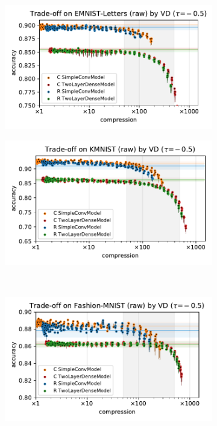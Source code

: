 \documentclass[a4paper,10pt,twocolumn]{article}
\begin{document}
\begin{figure}[b]
  \centering
  \begin{subfigure}[b]{0.5\columnwidth}
    \centering
    \includegraphics[width=\linewidth]{figure__mnist-like__trade-off/appendix__VD__emnist_letters__raw__-0.5.pdf}
  \end{subfigure}%
  \begin{subfigure}[b]{0.5\columnwidth}
    \centering
    \includegraphics[width=\linewidth]{figure__mnist-like__trade-off/appendix__VD__kmnist__raw__-0.5.pdf}
  \end{subfigure} \\%
  \begin{subfigure}[b]{0.5\columnwidth}
    \centering
    \includegraphics[width=\linewidth]{figure__mnist-like__trade-off/appendix__VD__fashionmnist__raw__-0.5.pdf}

\end{subfigure}
\end{figure}
\end{document}
